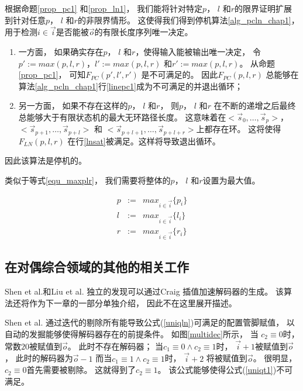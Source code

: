 根据命题\ref{prop_pc1} 和\ref{prop_ln1}，
我们能将针对特定$p$， $l$ 和$r$的限界证明扩展到针对任意$p$， $l$ 和$r$的非限界情形。
这使得我们得到停机算法\ref{alg_pcln_chap1}，
用于检测$i\in\vec{i}$是否能被$\vec{o}$的有限长度序列唯一决定。
\begin{enumerate}
 \item
一方面，
如果确实存在$p$， $l$ 和$r$，使得输入能被输出唯一决定，
令$p':=max(p,l,r)$，$l':=max(p,l,r)$ 和$r':=max(p,l,r)$。
从命题\ref{prop_pc1}，
可知$F_{PC}(p',l',r')$ 是不可满足的。
因此$F_{PC}(p,l,r)$ 总能够在算法\ref{alg_pcln_chap1}行\ref{linepc1}成为不可满足的并退出循环；
 \item
另一方面，
如果不存在这样的$p$， $l$ 和$r$，
则$p$， $l$ 和$r$ 在不断的递增之后最终总能够大于有限状态机的最大无环路径长度。
这意味着在$<\vec{s}_{0},\dots,\vec{s}_{p}>$，$<\vec{s}_{p+1},\dots,\vec{s}_{p+l}>$ 和
$<\vec{s}_{p+l+1},\dots,\vec{s}_{p+l+r}>$上都存在环。
这将使得$F_{LN}(p,l,r)$ 在行\ref{lnsat}被满足。这样将导致退出循环。
\end{enumerate}


因此该算法是停机的。

类似于等式{\ref{equ_maxplr}}，
我们需要将整体的$p$， $l$ 和$r$设置为最大值。

\begin{equation}\label{equ_maxplr_ln}
\begin{array}{ccc}
p & :=  & max_{i\in\vec{i}} \{p_i\}\\
l & :=  & max_{i\in\vec{i}} \{l_i\}\\
r & :=  & max_{i\in\vec{i}} \{r_i\}
\end{array}
\end{equation}

\subsection{在对偶综合领域的其他的相关工作}

Shen et al.和Liu et al. 独立的发现可以通过Craig 插值加速解码器的生成。
该算法还将作为下一章的一部分单独介绍，
因此不在这里展开描述。

Shen et al. 
通过迭代的剔除所有能导致公式(\ref{uniqln})可满足的配置管脚赋值，
以自动的发掘能够使得解码器存在的前提条件。
如图\ref{multidec}所示，
当 $c_2\equiv 0$时，
常数$20$被赋值到$\vec{o}$。
此时不存在解码器；
当$c_1\equiv 0\wedge c_2\equiv 1$时，
$\vec{i}+1$被赋值到$\vec{o}$，
此时的解码器为$\vec{o}-1$
而当$c_1\equiv 1\wedge c_2\equiv 1$时，
$\vec{i}+2$ 将被赋值到$\vec{o}$。
很明显，
$c_2\equiv 0$首先需要被剔除。
这就得到了$c_2\equiv 1$。
该公式能够使得公式(\ref{uniqt1})不可满足。

